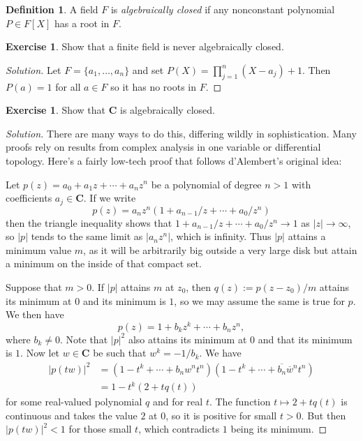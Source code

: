 \documentclass[11pt]{amsart}
\theoremstyle{definition}
\newtheorem{defi}[theo]{Definition}
\newtheorem{e}[theo]{Exercise}
\newenvironment{s}{\begin{proof}[Solution]}{\end{proof}}
\def\ov#1{\overline{#1}}
\def\CC{\mathbf{C}}
\begin{document}
\begin{defi}
A field $F$ is \emph{algebraically closed} if any nonconstant polynomial $P \in F[X]$ has a root in $F$.
\end{defi}

\begin{e}
Show that a finite field is never algebraically closed.
\end{e}

\begin{s}
Let $F = \{a_1, \ldots, a_n\}$ and set $P(X) = \prod_{j=1}^n(X - a_j) + 1$.
Then $P(a) = 1$ for all $a \in F$ so it has no roots in $F$.
\end{s}



\begin{e}
Show that $\CC$ is algebraically closed.
\end{e}

\begin{s}
There are many ways to do this, differing wildly in sophistication.
Many proofs rely on results from complex analysis in one variable or differential topology.
Here's a fairly low-tech proof that follows d'Alembert's original idea:

Let $p(z) = a_0 + a_1 z + \cdots + a_n z^n$ be a polynomial of degree $n > 1$ with coefficients $a_j \in \CC$.
If we write
\[
    p(z) = a_n z^n (1 + a_{n-1}/z + \cdots + a_0/z^n)
\]
then the triangle inequality shows that $1 + a_{n-1}/z + \cdots + a_0/z^n \to 1$ as $|z| \to \infty$,
so $|p|$ tends to the same limit as $|a_n z^n|$, which is infinity.
Thus $|p|$ attains a minimum value $m$, as it will be arbitrarily big outside
a very large disk but attain a minimum on the inside of that compact set.

Suppose that $m > 0$. If $|p|$ attains $m$ at $z_0$, then $q(z) := p(z-z_0)/m$
attains its minimum at $0$ and its minimum is $1$, so we may assume the same is
true for $p$. We then have
\[
    p(z) = 1 + b_k z^k + \cdots + b_n z^n,
\]
where $b_k \not= 0$.
Note that $|p|^2$ also attains its minimum at $0$ and that its minimum is $1$.
Now let $w \in \CC$ be such that $w^k = -1/b_k$.
We have
\begin{align*}
    |p(tw)|^2
    &= (1 - t^k + \cdots + b_n w^n t^n)
    (1 - t^k + \cdots + \ov{b_n}\ov w^n t^n)
    \\
    &= 1 - t^k(2 + t q(t))
\end{align*}
for some real-valued polynomial $q$ and for real $t$.
The function $t \mapsto 2 + tq(t)$ is continuous and takes the value $2$ at $0$,
so it is positive for small $t > 0$.
But then $|p(tw)|^2 < 1$ for those small $t$, which contradicts $1$ being its
minimum.
\end{s}
\end{document}
